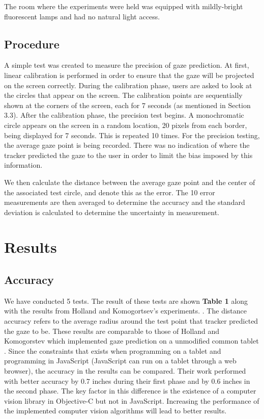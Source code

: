 \documentclass[annual]{acmsiggraph}
\begin{document}
The room where the experiments were held was equipped with mildly-bright
fluorescent lamps and had no natural light access. 

\subsection{Procedure}

A simple test was created to measure the precision of gaze prediction. At
first, linear calibration is performed in order to ensure that the gaze will be
projected on the screen correctly. During the calibration phase, users are
asked to look at the circles that appear on the screen. The calibration points
are sequentially shown at the corners of the screen, each for 7 seconds (as
mentioned in Section 3.3).  After the calibration phase, the precision test
begins.  A monochromatic circle appears on the screen in a random location, 20
pixels from each border, being displayed for 7 seconds.  This is repeated 10
times.  For the precision testing, the average gaze point is being recorded.
There was no indication of where the tracker predicted the gaze to the user in
order to limit the bias imposed by this information.

We then calculate the distance between the average gaze point and the center of
the associated test circle, and denote this as the error. The 10 error
measurements are then averaged to determine the accuracy and the standard
deviation is calculated to determine the uncertainty in measurement.

\section{Results}

\subsection{Accuracy}

We have conducted 5 tests. The result of these tests are shown \textbf{Table 1}
along with the results from Holland and Komogortsev's experiments.
.  The distance accuracy refers to the average radius
around the test point that tracker predicted the gaze to be. These results are
comparable to those of Holland and Komogorstev which implemented gaze
prediction on a unmodified common tablet . Since the
constraints that exists when programming on a tablet and programming in
JavaScript (JavaScript can run on a tablet through a web browser), the accuracy
in the results can be compared.  Their work performed with better accuracy by
0.7 inches during their first phase and by 0.6 inches in the second phase. The
key factor in this difference is the existence of a computer vision library in
Objective-C but not in JavaScript.  Increasing the performance of the
implemented computer vision algorithms will lead to better results.
\end{document}
